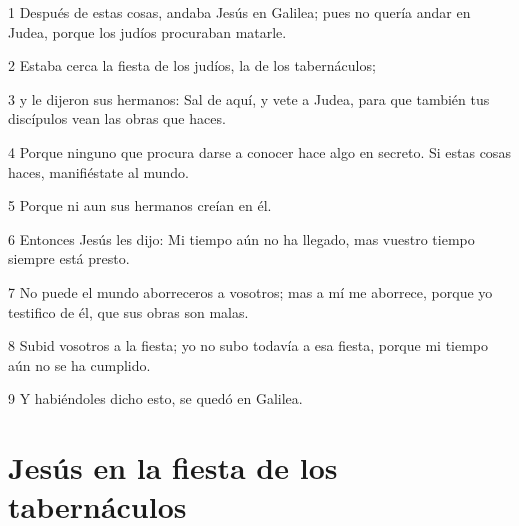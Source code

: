 \par 1 Después de estas cosas, andaba Jesús en Galilea; pues no quería andar en Judea, porque los judíos procuraban matarle.
\par 2 Estaba cerca la fiesta de los judíos, la de los tabernáculos;
\par 3 y le dijeron sus hermanos: Sal de aquí, y vete a Judea, para que también tus discípulos vean las obras que haces.
\par 4 Porque ninguno que procura darse a conocer hace algo en secreto. Si estas cosas haces, manifiéstate al mundo.
\par 5 Porque ni aun sus hermanos creían en él.
\par 6 Entonces Jesús les dijo: Mi tiempo aún no ha llegado, mas vuestro tiempo siempre está presto.
\par 7 No puede el mundo aborreceros a vosotros; mas a mí me aborrece, porque yo testifico de él, que sus obras son malas.
\par 8 Subid vosotros a la fiesta; yo no subo todavía a esa fiesta, porque mi tiempo aún no se ha cumplido.
\par 9 Y habiéndoles dicho esto, se quedó en Galilea.

\section*{Jesús en la fiesta de los tabernáculos}

